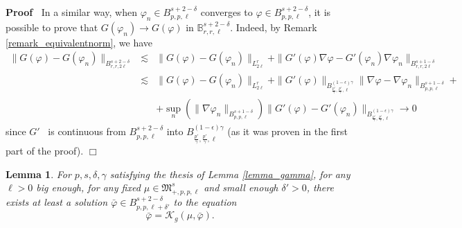 \documentclass[a4paper,10pt]{article}
\newenvironment{proof}{\noindent\textbf{Proof\ }}{\hspace*{\fill}$\Box$\medskip}
\newtheorem{lemma}[theorem]{Lemma}
\begin{document}
\begin{proof}
  In a similar way, when $\varphi_n \in B^{s + 2 - \delta}_{p, p, \ell}$
  converges to $\varphi \in B^{s + 2 - \delta}_{p, p, \ell}$, it is possible
  to prove that $G (\varphi_n) \rightarrow G (\varphi)$ in $\mathbb{B}^{s + 2
  - \delta}_{r, r, \ell}$. Indeed, by Remark \ref{remark_equivalentnorm}, we
  have
  \begin{eqnarray}
    \| G (\varphi) - G (\varphi_n) \|_{B^{s + 2 - \delta}_{r, r, 2 \ell}} &
    \lesssim & \| G (\varphi) - G (\varphi_n) \|_{L^r_{2 \ell}} + \| G'
    (\varphi) \nabla \varphi - G' (\varphi_n) \nabla \varphi_n \|_{B^{s + 1 -
    \delta}_{r, r, 2 \ell}} \nonumber\\
    & \lesssim & \| G (\varphi) - G (\varphi_n) \|_{L^r_{2 \ell}} + \| G'
    (\varphi) \|_{B^{(1 - \epsilon) \gamma}_{\frac{p'}{\gamma},
    \frac{p'}{\gamma}, \ell}} \| \nabla \varphi - \nabla \varphi_n \|_{B^{s +
    1 - \delta}_{p, p, \ell}} + \nonumber\\
    &  & + \sup_n (\| \nabla \varphi_n \|_{B^{s + 1 - \delta}_{p, p, \ell}})
    \| G' (\varphi) - G' (\varphi_n) \|_{B^{(1 - \epsilon)
    \gamma}_{\frac{p'}{\gamma}, \frac{p'}{\gamma}, \ell}} \rightarrow 0
    \nonumber
  \end{eqnarray}
  since $G'$ \ is continuous from $B^{s + 2 - \delta}_{p, p, \ell}$ into
  $B^{(1 - \epsilon) \gamma}_{\frac{p'}{\gamma}, \frac{p'}{\gamma}, \ell}$ (as
  it was proven in the first part of the proof).
\end{proof}

\begin{lemma}
  \label{lemma_exponentialexistence}For $p, s, \delta, \gamma$ satisfying the
  thesis of Lemma \ref{lemma_gamma}, for any $\ell > 0$ big enough, for any
  fixed $\mu \in \mathfrak{M}^s_{+, p, p, \ell}$ and small enough $\delta' >
  0$, there exists at least a solution $\bar{\varphi} \in B^{s + 2 -
  \delta}_{p, p, \ell + \delta'}$ to the equation
  \begin{equation}
    \bar{\varphi} = \mathcal{K}_g (\mu, \bar{\varphi}) . \label{eq:K1}
  \end{equation}
\end{lemma}
\end{document}
